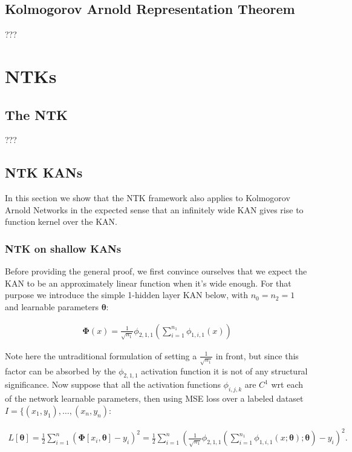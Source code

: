 \documentclass{article}
\begin{document}
\subsection{Kolmogorov Arnold Representation Theorem}
???



\section{NTKs}
\subsection{The NTK}
???

\subsection{NTK KANs}
In this section we show that the NTK framework also applies to Kolmogorov Arnold Networks in the expected sense that an infinitely wide 
KAN gives rise to function kernel over the KAN.

\subsubsection{NTK on shallow KANs} %
Before providing the general proof, we first convince ourselves that we expect the KAN to be an approximately linear function when it's wide 
enough. For that purpose we introduce the simple 1-hidden layer KAN below, with $n_0 = n_2 = 1$ and learnable parameters $\mathbf{\theta}$:

\begin{align}
    \mathbf{\Phi}(x) = \frac{1}{\sqrt{n_1}}\phi_{2, 1, 1}\left(\sum_{i=1}^{n_1} \phi_{1,i,1}(x)\right)
\end{align}

Note here the untraditional formulation of setting a $\frac{1}{\sqrt{n_1}}$ in front, but since this factor can be absorbed 
by the $\phi_{2, 1, 1}$ activation function it is not of any structural significance. Now suppose that all the activation 
functions $\phi_{i,j,k}$ are $C^{1}$ wrt each of the network learnable parameters, then using MSE loss over a labeled dataset 
$I = \lbrace (x_1, y_1), \dots, (x_n, y_n)$:

\begin{align}
    L[\mathbf{\theta}] = \frac{1}{2}\sum_{i=1}^{n}\left(\mathbf{\Phi}[x_i, \mathbf{\theta}] - y_i\right)^{2} = \frac{1}{2}\sum_{i=1}^{n}\left(\frac{1}{\sqrt{n_1}}\phi_{2, 1, 1}\left(\sum_{i=1}^{n_1} \phi_{1,i,1}(x; \mathbf{\theta}); \mathbf{\theta}\right) - y_i\right)^{2}.
\end{align}
\end{document}
